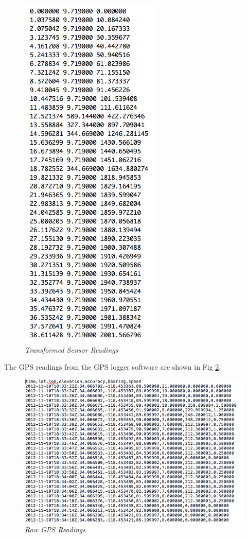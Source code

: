 \documentclass[12pt,fullpage,doublespace]{article}
\begin{document}
\begin{figure}
\begin{center}
\includegraphics[scale=0.45]{transformedData.png}
\caption{\small \sl Transformed Sensor Readings\label{fig:transformedData}}
\end{center}
\end{figure} The GPS readings from the GPS logger software are shown in Fig \ref{fig:gpsReadings}. 
\begin{figure}
\begin{center}
\includegraphics[scale=0.45]{gpsReadings.png}
\caption{\small \sl Raw GPS Readings\label{fig:gpsReadings}}
\end{center}
\end{figure}
\end{document}
